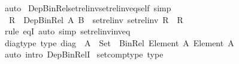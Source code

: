 \begin{isabellebody}
\ auto%
\endisatagproof
{\isafoldproof}%
%
\isadelimproof
\isanewline
%
\endisadelimproof
\isanewline
{}\isamarkupfalse%
\ Dep{\isacharunderscore}{\kern0pt}Bin{\isacharunderscore}{\kern0pt}Rel{\isacharunderscore}{\kern0pt}set{\isacharunderscore}{\kern0pt}rel{\isacharunderscore}{\kern0pt}inv{\isacharunderscore}{\kern0pt}set{\isacharunderscore}{\kern0pt}rel{\isacharunderscore}{\kern0pt}inv{\isacharunderscore}{\kern0pt}eq{\isacharunderscore}{\kern0pt}self\ {\isacharbrackleft}{\kern0pt}simp{\isacharbrackright}{\kern0pt}{\isacharcolon}{\kern0pt}\isanewline
\ \ {\isachardoublequoteopen}R\ {\isacharcolon}{\kern0pt}\ Dep{\isacharunderscore}{\kern0pt}Bin{\isacharunderscore}{\kern0pt}Rel\ A\ B\ {\isasymLongrightarrow}\ set{\isacharunderscore}{\kern0pt}rel{\isacharunderscore}{\kern0pt}inv\ {\isacharparenleft}{\kern0pt}set{\isacharunderscore}{\kern0pt}rel{\isacharunderscore}{\kern0pt}inv\ R{\isacharparenright}{\kern0pt}\ {\isacharequal}{\kern0pt}\ R{\isachardoublequoteclose}\isanewline
%
\isadelimproof
\ \ %
\endisadelimproof
%
\isatagproof
{}\isamarkupfalse%
\ {\isacharparenleft}{\kern0pt}rule\ eqI{\isacharparenright}{\kern0pt}\ {\isacharparenleft}{\kern0pt}auto\ simp{\isacharcolon}{\kern0pt}\ set{\isacharunderscore}{\kern0pt}rel{\isacharunderscore}{\kern0pt}inv{\isacharunderscore}{\kern0pt}inv{\isacharunderscore}{\kern0pt}eq{\isacharparenright}{\kern0pt}%
\endisatagproof
{\isafoldproof}%
%
\isadelimproof
\isanewline
%
\endisadelimproof
\isanewline
{}\isamarkupfalse%
\ diag{\isacharunderscore}{\kern0pt}type\ {\isacharbrackleft}{\kern0pt}type{\isacharbrackright}{\kern0pt}{\isacharcolon}{\kern0pt}\ {\isachardoublequoteopen}diag\ {\isacharcolon}{\kern0pt}\ {\isacharparenleft}{\kern0pt}A\ {\isacharcolon}{\kern0pt}\ Set{\isacharparenright}{\kern0pt}\ {\isasymRightarrow}\ Bin{\isacharunderscore}{\kern0pt}Rel\ {\isacharparenleft}{\kern0pt}Element\ A{\isacharparenright}{\kern0pt}\ {\isacharparenleft}{\kern0pt}Element\ A{\isacharparenright}{\kern0pt}{\isachardoublequoteclose}\isanewline
%
\isadelimproof
\ \ %
\endisadelimproof
%
\isatagproof
{}\isamarkupfalse%
\ {\isacharparenleft}{\kern0pt}auto\ intro{\isacharcolon}{\kern0pt}\ Dep{\isacharunderscore}{\kern0pt}Bin{\isacharunderscore}{\kern0pt}RelI{\isacharparenright}{\kern0pt}%
\endisatagproof
{\isafoldproof}%
%
\isadelimproof
\isanewline
%
\endisadelimproof
\isanewline
{}\isamarkupfalse%
\ set{\isacharunderscore}{\kern0pt}comp{\isacharunderscore}{\kern0pt}type\ {\isacharbrackleft}{\kern0pt}type{\isacharbrackright}{\kern0pt}{\isacharcolon}{\kern0pt}\isanewline

\end{isabellebody}
